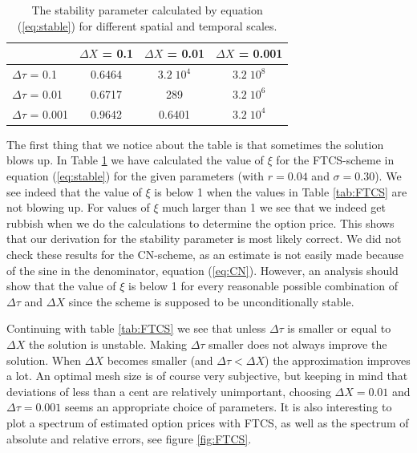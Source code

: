 \documentclass[11pt,a4paper]{article}
\begin{document}
\begin{table}[H]
  \centering
  \begin{tabular}{l || c | c | c}
    & $\Delta X$ = 0.1 & $\Delta X$ = 0.01 &$\Delta X$ = 0.001\\
    \hline
    $\Delta \tau$ = 0.1 & 0.6464 & $3.2 \; 10^4$ & $3.2 \; 10^8$ \\
    $\Delta \tau$ = 0.01 & 0.6717 & 289 & $3.2 \; 10^6$ \\
    $\Delta \tau$ = 0.001 & 0.9642 & 0.6401 & $3.2 \; 10^4$ \\
  \end{tabular}
  \caption{The stability parameter calculated by equation (\ref{eq:stable}) for different spatial and temporal scales.}
  \label{tab:stable}
\end{table}
The first thing that we notice about the table is that sometimes the solution blows up. In Table \ref{tab:stable} we have calculated the value of $\xi$ for the FTCS-scheme in equation (\ref{eq:stable}) for the given parameters (with $r = 0.04$ and $\sigma = 0.30$). We see indeed that the value of $\xi$ is below 1 when the values in Table \ref{tab:FTCS} are not blowing up. For values of $\xi$ much larger than 1 we see that we indeed get rubbish when we do the calculations to determine the option price. This shows that our derivation for the stability parameter is most likely correct. We did not check these results for the CN-scheme, as an estimate is not easily made because of the sine in the denominator, equation (\ref{eq:CN}). However, an analysis should show that the value of $\xi$ is below 1 for every reasonable possible combination of $\Delta \tau$ and $\Delta X$ since the scheme is supposed to be unconditionally stable.

Continuing with table \ref{tab:FTCS} we see that unless $\Delta \tau$ is smaller or equal to $\Delta X$ the solution is unstable. Making $\Delta \tau$ smaller does not always improve the solution. When $\Delta X$ becomes smaller (and $\Delta \tau < \Delta X$) the approximation improves a lot. An optimal mesh size is of course very subjective, but keeping in mind that deviations of less than a cent are relatively unimportant, choosing $\Delta X = 0.01$ and $\Delta \tau = 0.001$ seems an appropriate choice of parameters. It is also interesting to plot a spectrum of estimated option prices with FTCS, as well as the spectrum of absolute and relative errors, see figure \ref{fig:FTCS}. 
\end{document}
